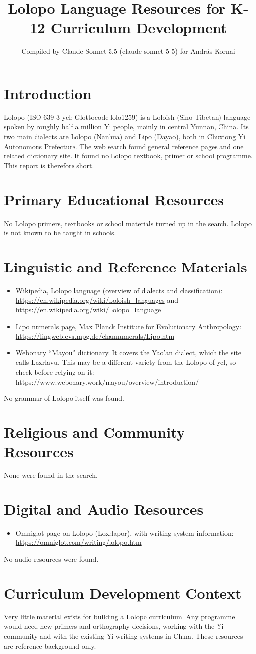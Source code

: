 \documentclass[12pt]{article}
\title{Lolopo Language Resources for K-12 Curriculum Development}
\author{Compiled by Claude Sonnet 5.5 (claude-sonnet-5-5) for Andr\'as Kornai}
\date{}
\begin{document}
\maketitle

\section{Introduction}
Lolopo (ISO 639-3 ycl; Glottocode lolo1259) is a Loloish (Sino-Tibetan) language spoken by roughly half a million Yi people, mainly in central Yunnan, China. Its two main dialects are Lolopo (Nanhua) and Lipo (Dayao), both in Chuxiong Yi Autonomous Prefecture. The web search found general reference pages and one related dictionary site. It found no Lolopo textbook, primer or school programme. This report is therefore short.

\section{Primary Educational Resources}
No Lolopo primers, textbooks or school materials turned up in the search. Lolopo is not known to be taught in schools.

\section{Linguistic and Reference Materials}
\begin{itemize}
\item Wikipedia, Lolopo language (overview of dialects and classification): \url{https://en.wikipedia.org/wiki/Loloish_languages} and \url{https://en.wikipedia.org/wiki/Lolopo_language}
\item Lipo numerals page, Max Planck Institute for Evolutionary Anthropology: \url{https://lingweb.eva.mpg.de/channumerals/Lipo.htm}
\item Webonary ``Mayou'' dictionary. It covers the Yao'an dialect, which the site calls Loxrlavu. This may be a different variety from the Lolopo of ycl, so check before relying on it: \url{https://www.webonary.work/mayou/overview/introduction/}
\end{itemize}
No grammar of Lolopo itself was found.

\section{Religious and Community Resources}
None were found in the search.

\section{Digital and Audio Resources}
\begin{itemize}
\item Omniglot page on Lolopo (Loxrlapor), with writing-system information: \url{https://omniglot.com/writing/lolopo.htm}
\end{itemize}
No audio resources were found.

\section{Curriculum Development Context}
Very little material exists for building a Lolopo curriculum. Any programme would need new primers and orthography decisions, working with the Yi community and with the existing Yi writing systems in China. These resources are reference background only.
\end{document}

